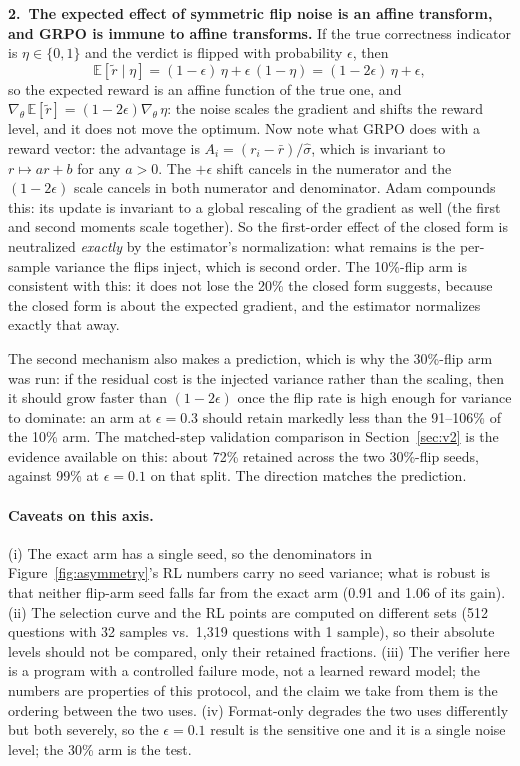 \documentclass{article}
\begin{document}
\textbf{2.\ The expected effect of symmetric flip noise is an affine transform, and GRPO is immune to affine transforms.} If the true correctness indicator is $\eta\in\{0,1\}$ and the verdict is flipped with probability $\epsilon$, then
\begin{equation}
\mathbb{E}[\tilde r \mid \eta] = (1-\epsilon)\,\eta + \epsilon\,(1-\eta) = (1-2\epsilon)\,\eta + \epsilon,
\label{eq:affine}
\end{equation}
so the expected reward is an affine function of the true one, and $\nabla_\theta\,\mathbb{E}[\tilde r] = (1-2\epsilon)\nabla_\theta\,\eta$: the noise scales the gradient and shifts the reward level, and it does not move the optimum. Now note what GRPO does with a reward vector: the advantage is $A_i = (r_i - \bar r)/\hat\sigma$, which is invariant to $r \mapsto ar + b$ for any $a>0$. The $+\epsilon$ shift cancels in the numerator and the $(1-2\epsilon)$ scale cancels in both numerator and denominator. Adam compounds this: its update is invariant to a global rescaling of the gradient as well (the first and second moments scale together). So the first-order effect of the closed form is neutralized \emph{exactly} by the estimator's normalization: what remains is the per-sample variance the flips inject, which is second order. The 10\%-flip arm is consistent with this: it does not lose the 20\% the closed form suggests, because the closed form is about the expected gradient, and the estimator normalizes exactly that away.

The second mechanism also makes a prediction, which is why the 30\%-flip arm was run: if the residual cost is the injected variance rather than the scaling, then it should grow faster than $(1-2\epsilon)$ once the flip rate is high enough for variance to dominate: an arm at $\epsilon=0.3$ should retain markedly less than the 91--106\% of the 10\% arm. The matched-step validation comparison in Section~\ref{sec:v2} is the evidence available on this: about 72\% retained across the two 30\%-flip seeds, against 99\% at $\epsilon=0.1$ on that split. The direction matches the prediction.

\paragraph{Caveats on this axis.} (i) The exact arm has a single seed, so the denominators in Figure~\ref{fig:asymmetry}'s RL numbers carry no seed variance; what is robust is that neither flip-arm seed falls far from the exact arm (0.91 and 1.06 of its gain). (ii) The selection curve and the RL points are computed on different sets (512 questions with 32 samples vs.\ 1{,}319 questions with 1 sample), so their absolute levels should not be compared, only their retained fractions. (iii) The verifier here is a program with a controlled failure mode, not a learned reward model; the numbers are properties of this protocol, and the claim we take from them is the ordering between the two uses. (iv) Format-only degrades the two uses differently but both severely, so the $\epsilon=0.1$ result is the sensitive one and it is a single noise level; the 30\% arm is the test.
\end{document}
